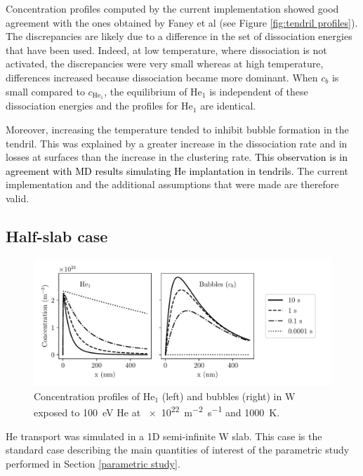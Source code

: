 Concentration profiles computed by the current implementation showed good agreement with the ones obtained by Faney et al\cite{faney_spatially_2015} (see Figure \ref{fig:tendril profiles}).
The discrepancies are likely due to a difference in the set of dissociation energies that have been used.
Indeed, at low temperature, where dissociation is not activated, the discrepancies were very small whereas at high temperature, differences increased because dissociation became more dominant.
When $c_b$ is small compared to $c_{\mathrm{He}_1}$, the equilibrium of $\mathrm{He}_1$ is independent of these dissociation energies and the profiles for $\mathrm{He}_1$ are identical.

Moreover, increasing the temperature tended to inhibit bubble formation in the tendril.
This was explained by a greater increase in the dissociation rate and in losses at surfaces than the increase in the clustering rate.
\textcolor{black}{This observation is in agreement with MD results simulating He implantation in tendrils.}
The current implementation and the additional assumptions that were made are therefore valid.

\subsection{Half-slab case} \label{half slab}

\begin{figure}
    \centering
    \includegraphics[width=\linewidth]{Figures/Chapter4/half_slab/profiles_half_slab.pdf}
    \caption{Concentration profiles of He$_1$ (left) and bubbles (right) in W exposed to \SI{100}{eV} He at \SI{e22}{m^{-2}.s^{-1}} and \SI{1000}{K}.}
    \label{fig:profiles half slab}
\end{figure}

He transport was simulated in a 1D semi-infinite W slab.
This case is the standard case describing the main quantities of interest of the parametric study performed in Section \ref{parametric study}.


